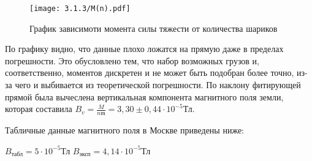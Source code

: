 \documentclass[a4paper,12pt]{article} %
\begin{document}
\begin{figure}[H]
    \centering
    \texttt{[image: 3.1.3/M(n).pdf]}
    \caption{График зависимоти момента силы тяжести от количества шариков}
    \label{mn}
\end{figure}

По графику видно, что данные плохо ложатся на прямую даже в пределах погрешности. Это обусловлено тем, что набор возможных грузов и, соответственно, моментов дискретен и не может быть подобран более точно, из-за чего и выбивается из теоретической погрешности.
По наклону фитирующей прямой была вычеслена вертикальная компонента магнитного поля земли, которая составила $B_v = \frac{M}{n\mathfrak{m}} = 3,30 \pm 0,44 \cdot 10^{-5} \text{Тл}$.

Табличные данные магнитного поля в Москве приведены ниже:
\begin{center}
\centering
    $B_{\text{табл}} = 5 \cdot 10^{-5} \text{Тл}$ \break
    $B_{\text{эксп}} = 4,14 \cdot 10^{-5} \text{Тл}$
    
\end{center}
\end{document}
